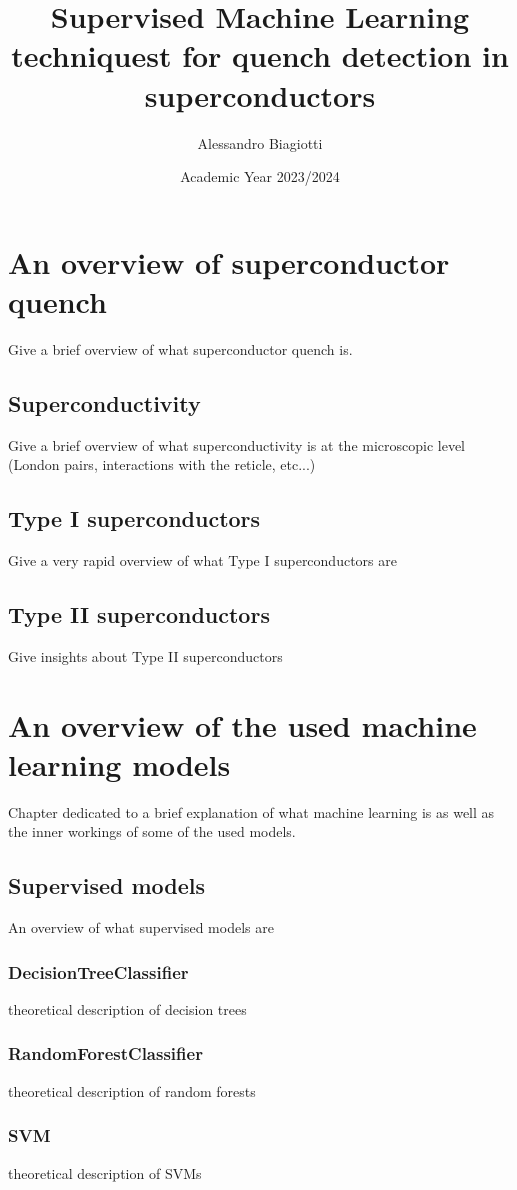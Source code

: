 \documentclass[a4paper]{book}
\title{\textsf{Supervised Machine Learning techniquest for quench detection in superconductors}}
\author{Alessandro Biagiotti}
\date{Academic Year 2023/2024}
\begin{document}
\frontmatter

\maketitle

\tableofcontents

\mainmatter

\chapter{An overview of superconductor quench}
Give a brief overview of what superconductor quench is.
\section{Superconductivity}
Give a brief overview of what superconductivity is at the microscopic level (London pairs,
interactions with the reticle, etc...)
\section{Type I superconductors}
Give a very rapid overview of what Type I superconductors are
\section{Type II superconductors}
Give insights about Type II superconductors
\chapter{An overview of the used machine learning models}
Chapter dedicated to a brief explanation of what machine learning is as well as the inner workings
of some of the used models.
\section{Supervised models}
An overview of what supervised models are
\subsection{DecisionTreeClassifier}
theoretical description of decision trees
\subsection{RandomForestClassifier}
theoretical description of random forests
\subsection{SVM}
theoretical description of SVMs
\end{document}
